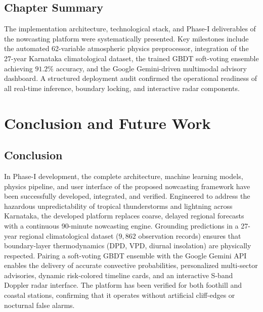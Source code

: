 \documentclass[12pt,a4paper]{report}
\begin{document}
\section{Chapter Summary}
The implementation architecture, technological stack, and Phase-I deliverables of the nowcasting platform were systematically presented. Key milestones include the automated 62-variable atmospheric physics preprocessor, integration of the 27-year Karnataka climatological dataset, the trained GBDT soft-voting ensemble achieving $91.2\%$ accuracy, and the Google Gemini-driven multimodal advisory dashboard. A structured deployment audit confirmed the operational readiness of all real-time inference, boundary locking, and interactive radar components.

\chapter{Conclusion and Future Work}
\thispagestyle{empty}

\section{Conclusion}
In Phase-I development, the complete architecture, machine learning models, physics pipeline, and user interface of the proposed nowcasting framework have been successfully developed, integrated, and verified. Engineered to address the hazardous unpredictability of tropical thunderstorms and lightning across Karnataka, the developed platform replaces coarse, delayed regional forecasts with a continuous 90-minute nowcasting engine. Grounding predictions in a 27-year regional climatological dataset ($9,862$ observation records) ensures that boundary-layer thermodynamics (DPD, VPD, diurnal insolation) are physically respected. Pairing a soft-voting GBDT ensemble with the Google Gemini API enables the delivery of accurate convective probabilities, personalized multi-sector advisories, dynamic risk-colored timeline cards, and an interactive S-band Doppler radar interface. The platform has been verified for both foothill and coastal stations, confirming that it operates without artificial cliff-edges or nocturnal false alarms.
\end{document}
